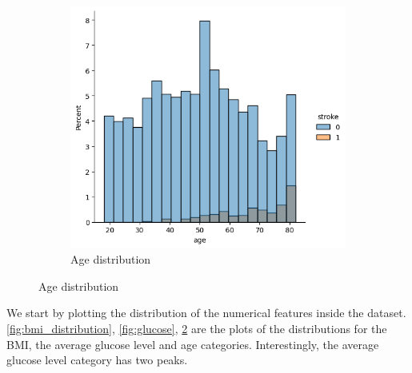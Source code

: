 \documentclass{Configuration_Files/Template}
\begin{document}
\begin{figure}[ht]
\begin{subfigure}[b]{\linewidth}
\centering
\includegraphics[scale=0.4]{Images/age_distribution.png}
\caption{Age distribution}
\label{fig:age_distribution}
\end{subfigure}
\end{figure}

We start by plotting the distribution of the numerical features inside the dataset. \ref{fig:bmi_distribution}, \ref{fig:glucose}, \ref{fig:age_distribution} are the plots of the distributions for the BMI, the average glucose level and age categories. Interestingly, the average glucose level category has two peaks.
\end{document}
